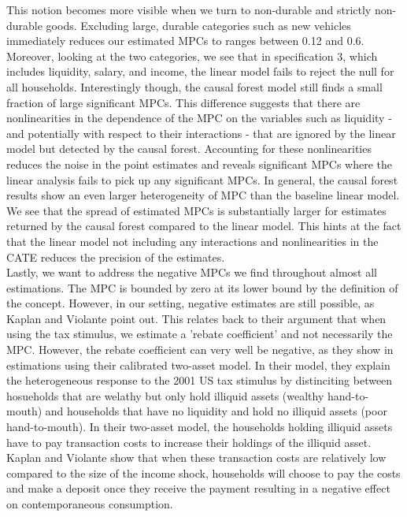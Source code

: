 This notion becomes more visible when we turn to non-durable and strictly non-durable goods. Excluding large, durable categories such as new vehicles immediately reduces our estimated MPCs to ranges between 0.12 and 0.6. Moreover, looking at the two categories, we see that in specification 3, which includes liquidity, salary, and income, the linear model fails to reject the null for all households. Interestingly though, the causal forest model still finds a small fraction of large significant MPCs. This difference suggests that there are nonlinearities in the dependence of the MPC on the variables such as liquidity - and potentially with respect to their interactions - that are ignored by the linear model but detected by the causal forest. Accounting for these nonlinearities reduces the noise in the point estimates and reveals significant MPCs where the linear analysis fails to pick up any significant MPCs. In general, the causal forest results show an even larger heterogeneity of MPC than the baseline linear model. We see that the spread of estimated MPCs is substantially larger for estimates returned by the causal forest compared to the linear model. This hints at the fact that the linear model not including any interactions and nonlinearities in the CATE reduces the precision of the estimates. \\
Lastly, we want to address the negative MPCs we find throughout almost all estimations. The MPC is bounded by zero at its lower bound by the definition of the concept. However, in our setting, negative estimates are still possible, as Kaplan and Violante point out. This relates back to their argument that when using the tax stimulus, we estimate a 'rebate coefficient' and not necessarily the MPC. However, the rebate coefficient can very well be negative, as they show in estimations using their calibrated two-asset model. In their model, they explain the heterogeneous response to the 2001 US tax stimulus by distinciting between hosueholds that are welathy but only hold illiquid assets (wealthy hand-to-mouth) and households that have no liquidity and hold no illiquid assets (poor hand-to-mouth). In their two-asset model, the households holding illiquid assets have to pay transaction costs to increase their holdings of the illiquid asset. Kaplan and Violante show that when these transaction costs are relatively low compared to the size of the income shock, households will choose to pay the costs and make a deposit once they receive the payment resulting in a negative effect on contemporaneous consumption. 